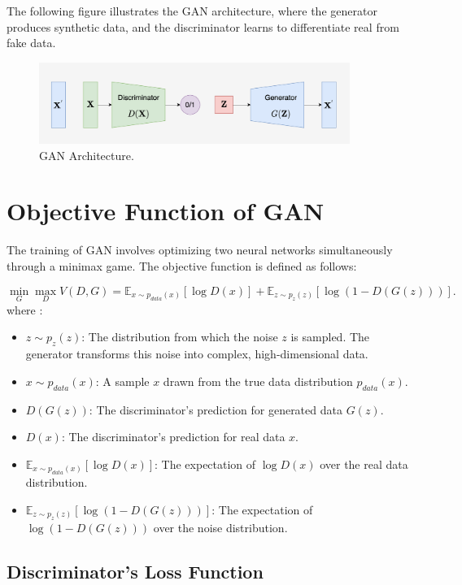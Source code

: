 The following figure illustrates the GAN architecture, where the generator produces synthetic data, and the discriminator learns to differentiate real from fake data.

\begin{figure}[H]
    \centering
    \includegraphics[width=0.9\textwidth]{./Images/GAN_structure.jpg}
    \caption{GAN Architecture.}
    \label{fig:GAN_structure}
\end{figure}


\section{Objective Function of GAN}

The training of GAN involves optimizing two neural networks simultaneously through a minimax game. The objective function is defined as follows:

\begin{equation}
    \min_{G} \max_{D} V(D, G) = \mathbb{E}_{x \sim p_{data}(x)} [\log D(x)] + \mathbb{E}_{z \sim p_{z}(z)} [\log(1 - D(G(z)))].
\end{equation}
where :
\begin{itemize}
    \item \(z \sim p_z(z)\): The distribution from which the noise \(z\) is sampled. The generator transforms this noise into complex, high-dimensional data.
    \item \(x \sim p_{data}(x)\): A sample \(x\) drawn from the true data distribution \(p_{data}(x)\).
    \item \(D(G(z))\): The discriminator's prediction for generated data \(G(z)\).
    \item \(D(x)\): The discriminator's prediction for real data \(x\).
    \item \(\mathbb{E}_{x \sim p_{data}(x)}[\log D(x)]\): The expectation of \(\log D(x)\) over the real data distribution.
    \item \(\mathbb{E}_{z \sim p_z(z)}[\log(1 - D(G(z)))]\): The expectation of \(\log(1 - D(G(z)))\) over the noise distribution.
\end{itemize}

\subsection{Discriminator's Loss Function}


